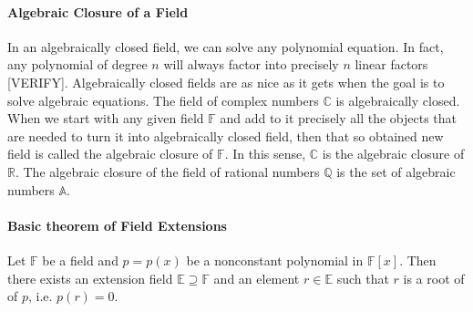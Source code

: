 


\paragraph{Algebraic Closure of a Field}
In an algebraically closed field, we can solve any polynomial equation. In fact, any polynomial of degree $n$ will always factor into precisely $n$ linear factors [VERIFY]. Algebraically closed fields are as nice as it gets when the goal is to solve algebraic equations. The field of complex numbers $\mathbb{C}$ is algebraically closed. When we start with any given field $\mathbb{F}$ and add to it precisely all the objects that are needed to turn it into algebraically closed field, then that so obtained new field is called the algebraic closure of $\mathbb{F}$. In this sense, $\mathbb{C}$ is the algebraic closure of $\mathbb{R}$. The algebraic closure of the field of rational numbers $\mathbb{Q}$ is the set of algebraic numbers $\mathbb{A}$. 





\paragraph{Basic theorem of Field Extensions}
Let $\mathbb{F}$ be a field and $p = p(x)$ be a nonconstant polynomial in $\mathbb{F}[x]$. Then there exists an extension field $\mathbb{E} \supseteq \mathbb{F}$ and an element $r \in \mathbb{E}$ such that $r$ is a root of of $p$, i.e. $p(r) = 0$.

